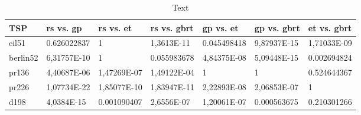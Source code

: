 \begin{table}[h]
	\centering
	\caption{Text}
	\label{tab:conover-p}
	
	\begin{adjustbox}{width=1\textwidth}
		\begin{tabular}{ l | l | l | l | l | l | l}
			TSP & \gls{rs} vs. \gls{gp} & \gls{rs} vs. \gls{et} & \gls{rs} vs. \gls{gbrt} & \gls{gp} vs. \gls{et} & \gls{gp} vs. \gls{gbrt} & \gls{et} vs. \gls{gbrt} \\ \hline
			eil51 & \num{0.626022837} & \num{1} & \cellcolor{green!25} \num{1,3613E-11} & \cellcolor{green!25} \num{0,045498418} &  \cellcolor{green!25} \num{9,87937E-15} &\cellcolor{green!25}  \num{1,71033E-09} \\ \hline
			berlin52 & \cellcolor{green!25} \num{6,31757E-10} & \num{1} & \num{0,055983678} & \cellcolor{green!25} \num{4,84375E-08} & \cellcolor{green!25} \num{5,09448E-15} & \cellcolor{green!25} \num{0,002694824} \\ \hline
			pr136 & \cellcolor{green!25} \num{4,40687E-06} &\cellcolor{green!25}  \num{1,47269E-07} & \cellcolor{green!25} \num{1,49122E-04} & \num{1} & \num{1} & \num{0,524644367} \\ \hline
			pr226 & \cellcolor{green!25} \num{1,07734E-22} & \cellcolor{green!25} \num{1,85077E-10} & \cellcolor{green!25} \num{1,83947E-11} & \cellcolor{green!25} \num{2,22893E-08} & \cellcolor{green!25} \num{2,06853E-07} & \num{1} \\ \hline
			d198 & \cellcolor{green!25} \num{4,0384E-15} & \cellcolor{green!25} \num{0,001090407} & \cellcolor{green!25} \num{2,6556E-07} & \cellcolor{green!25} \num{1,20061E-07} & \cellcolor{green!25}  \num{0,000563675} & \num{0,210301266} \\
		\end{tabular}
	\end{adjustbox}
\end{table}

